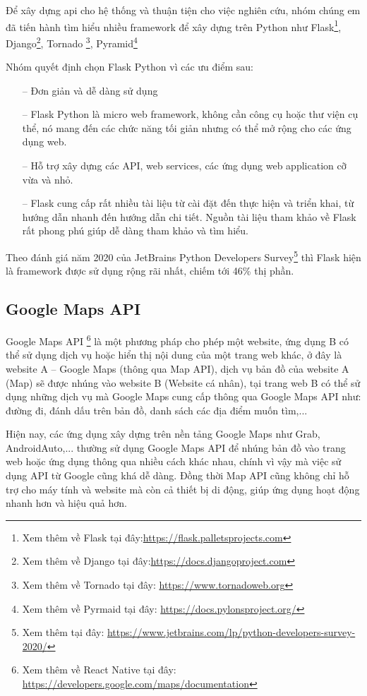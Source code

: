 Để xây dựng \ac{api} cho hệ thống và thuận tiện cho việc nghiên cứu, nhóm chúng em đã tiến hành tìm hiểu nhiều framework để xây dựng trên Python như Flask\footnote{Xem thêm về Flask tại đây:\url{https://flask.palletsprojects.com}}, Django\footnote{Xem thêm về Django tại đây:\url{https://docs.djangoproject.com}}, Tornado \footnote{Xem thêm về Tornado tại đây: \url{https://www.tornadoweb.org}}, Pyramid\footnote{Xem thêm về Pyrmaid tại đây: \url{https://docs.pylonsproject.org/}}

Nhóm quyết định chọn Flask Python vì các ưu điểm sau:
\begin{itemize}
    \item[--] Đơn giản và dễ dàng sử dụng
    \item[--] Flask Python là micro web framework, không cần công cụ hoặc thư viện cụ thể, nó mang đến các chức năng tối giản nhưng có thể mở rộng cho các ứng dụng web.
    \item[--] Hỗ trợ xây dựng các API, web services, các ứng dụng web application cỡ vừa và nhỏ.
    \item[--] Flask cung cấp rất nhiều tài liệu từ cài đặt đến thực hiện và triển khai, từ hướng dẫn nhanh đến hướng dẫn chi tiết. Nguồn tài liệu tham khảo về Flask rất phong phú giúp dễ dàng tham khảo và tìm hiểu.
\end{itemize}

Theo đánh giá năm 2020 của JetBrains Python Developers Survey\footnote{Xem thêm tại đây: \url{https://www.jetbrains.com/lp/python-developers-survey-2020/}} thì Flask hiện là framework được sử dụng rộng rãi nhất, chiếm tới 46\% thị phần.
\subsection{Google Maps API}
Google Maps API \footnote{Xem thêm về React Native tại đây: \url{https://developers.google.com/maps/documentation}} là một phương pháp cho phép một website, ứng dụng B có thể sử dụng dịch vụ hoặc hiển thị nội dung của một trang web khác, ở đây là website A – Google Maps (thông qua Map API), dịch vụ bản đồ của website A (Map) sẽ được nhúng vào website B (Website cá nhân), tại trang web B có thể sử dụng những dịch vụ mà Google Maps cung cấp thông qua Google Maps API như: đường đi, đánh dấu trên bản đồ, danh sách các địa điểm muốn tìm,...

Hiện nay, các ứng dụng xây dựng trên nền tảng Google Maps như Grab, AndroidAuto,... thường sử dụng Google Maps API để nhúng bản đồ vào trang web hoặc ứng dụng thông qua nhiều cách khác nhau, chính vì vậy mà việc sử dụng API từ Google cũng khá dễ dàng. Đồng thời Map API cũng không chỉ hỗ trợ cho máy tính và website mà còn cả thiết bị di động, giúp ứng dụng hoạt động nhanh hơn và hiệu quả hơn.

